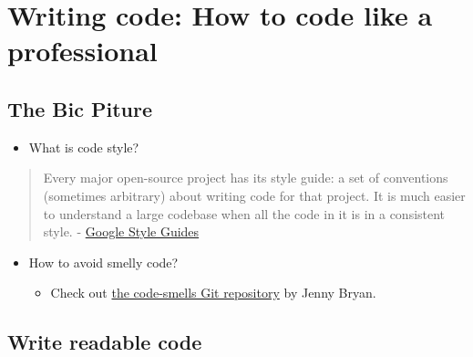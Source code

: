 \documentclass[
  letterpaper,
  DIV=11,
  numbers=noendperiod]{scrreprt}
\providecommand{\tightlist}{%
  \setlength{\itemsep}{0pt}\setlength{\parskip}{0pt}}\usepackage{longtable,booktabs,array}
\begin{document}
\hypertarget{writing-code-how-to-code-like-a-professional}{%
\section*{Writing code: How to code like a
professional}\label{writing-code-how-to-code-like-a-professional}}

\hypertarget{the-bic-piture}{%
\subsection*{The Bic Piture}\label{the-bic-piture}}

\begin{itemize}
\tightlist
\item
  What is code style?
\end{itemize}

\begin{quote}
Every major open-source project has its style guide: a set of
conventions (sometimes arbitrary) about writing code for that project.
It is much easier to understand a large codebase when all the code in it
is in a consistent style. -
\href{https://google.GitHub.io/styleguide/}{Google Style Guides}
\end{quote}

\begin{itemize}
\item
  How to avoid smelly code?

  \begin{itemize}
  \tightlist
  \item
    Check out
    \href{https://GitHub.com/jennybc/code-smells-and-feels\#readme}{the
    code-smells Git repository} by Jenny Bryan.
  \end{itemize}
\end{itemize}

\hypertarget{write-readable-code}{%
\subsection*{Write readable code}\label{write-readable-code}}
\end{document}
